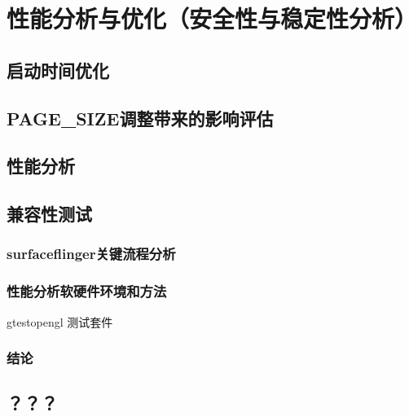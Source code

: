 
\chapter{性能分析与优化（安全性与稳定性分析）}

\section{启动时间优化}

\section{PAGE\_SIZE调整带来的影响评估}

\section{性能分析}

\section{兼容性测试}

\subsection{surfaceflinger关键流程分析}

\subsection{性能分析软硬件环境和方法} gtestopengl 测试套件

\subsection{结论}

\section{？？？}

